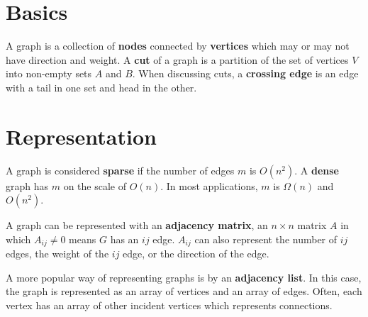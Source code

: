 \documentclass[11pt]{article}
\begin{document}
\section{Basics}
	A graph is a collection of \textbf{nodes} connected by \textbf{vertices} which may or may not have direction and weight. A \textbf{cut} of a graph is a partition of the set of vertices $V$ into non-empty sets $A$ and $B$. When discussing cuts, a \textbf{crossing edge} is an edge with a tail in one set and head in the other.
	
\section{Representation}
	A graph is considered \textbf{sparse} if the number of edges $m$ is $O(n^2)$. A \textbf{dense} graph has $m$ on the scale of $O(n)$. In most applications, $m$ is $\Omega(n)$ and $O(n^2)$.
	
	A graph can be represented with an \textbf{adjacency matrix}, an $n\times n$ matrix $A$ in which $A_{ij} \neq 0$ means $G$ has an $ij$ edge. $A_{ij}$ can also represent the number of $ij$ edges, the weight of the $ij$ edge, or the direction of the edge.
	
	A more popular way of representing graphs is by an \textbf{adjacency list}. In this case, the graph is represented as an array of vertices and an array of edges. Often, each vertex has an array of other incident vertices which represents connections.

%		
%		


\end{document}
